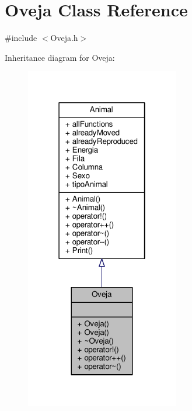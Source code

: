 \hypertarget{classOveja}{}\section{Oveja Class Reference}
\label{classOveja}


{\ttfamily \#include $<$Oveja.\+h$>$}



Inheritance diagram for Oveja\+:\nopagebreak
\begin{figure}[H]
\begin{center}
\leavevmode
\includegraphics[width=190pt]{classOveja__inherit__graph}
\end{center}
\end{figure}


